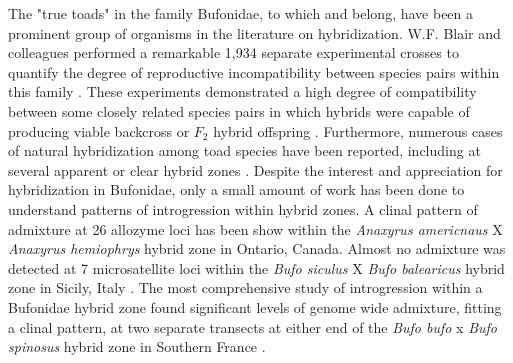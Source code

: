The "true toads" in the family Bufonidae, to which \amer and \terr belong,  
have been a prominent group of organisms in the literature on hybridization. 
W.F. Blair and colleagues performed a remarkable 1,934 separate experimental crosses 
to quantify the degree of reproductive incompatibility between species pairs within
this family \parencite{blair1972,malone2008}.
These experiments demonstrated a high degree of compatibility between some closely 
related species pairs in which hybrids were capable of producing viable backcross 
or $F_2$ hybrid offspring \parencite{blair1963}.
Furthermore, numerous cases of natural hybridization among toad species have been 
reported, including at several apparent or clear hybrid zones 
\parencite{green1996,vanriemsdijk2023,colliard2010,weatherby1982}.
Despite the interest and appreciation for hybridization in Bufonidae, only a 
small amount of work has been done to understand patterns of introgression
within hybrid zones. 
A clinal pattern of admixture at 26 allozyme loci has been show within the 
\textit{Anaxyrus americnaus} X \textit{Anaxyrus hemiophrys} hybrid zone in 
Ontario, Canada\parencite{green1983}.
Almost no admixture was detected at 7 microsatellite loci within the \textit{Bufo siculus} X 
\textit{Bufo balearicus} hybrid zone in Sicily, Italy \parencite{colliard2010}.
The most comprehensive study of introgression within a Bufonidae hybrid zone found 
significant levels of genome wide admixture, fitting a clinal pattern, at two separate transects 
at either end of the \textit{Bufo bufo} x \textit{Bufo spinosus} hybrid zone
in Southern France \parencite{vanriemsdijk2023}.



